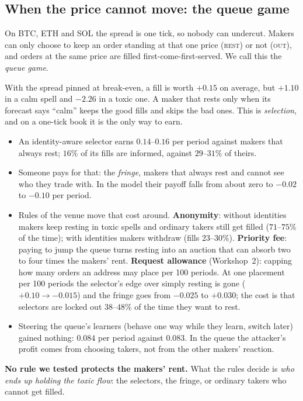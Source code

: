 \documentclass[11pt]{article}
\begin{document}
\subsection{When the price cannot move: the queue game}
On BTC, ETH and SOL the spread is one tick, so nobody can undercut. Makers can only choose to keep an
order standing at that one price (\textsc{rest}) or not (\textsc{out}), and orders at the same price are
filled first-come-first-served. We call this the \emph{queue game}.
\begin{example}
With the spread pinned at break-even, a fill is worth $+0.15$ on average, but $+1.10$ in a calm spell
and $-2.26$ in a toxic one. A maker that rests only when its forecast says ``calm'' keeps the good fills
and skips the bad ones. This is \emph{selection}, and on a one-tick book it is the only way to earn.
\end{example}
\begin{itemize}
\item An identity-aware selector earns $0.14$--$0.16$ per period against makers that always rest; $16\%$
of its fills are informed, against $29$--$31\%$ of theirs.
\item Someone pays for that: the \emph{fringe}, makers that always rest and cannot see who they trade
with. In the model their payoff falls from about zero to $-0.02$ to $-0.10$ per period.
\item Rules of the venue move that cost around. \textbf{Anonymity}: without identities makers keep
resting in toxic spells and ordinary takers still get filled ($71$--$75\%$ of the time); with identities
makers withdraw (fills $23$--$30\%$). \textbf{Priority fee}: paying to jump the queue turns resting into
an auction that can absorb two to four times the makers' rent. \textbf{Request allowance} (Workshop~2):
capping how many orders an address may place per 100 periods. At one placement per 100 periods the
selector's edge over simply resting is gone ($+0.10\to-0.015$) and the fringe goes from $-0.025$ to
$+0.030$; the cost is that selectors are locked out $38$--$48\%$ of the time they want to rest.
\item Steering the queue's learners (behave one way while they learn, switch later) gained nothing:
$0.084$ per period against $0.083$. In the queue the attacker's profit comes from choosing takers, not
from the other makers' reaction.
\end{itemize}
\begin{warning}
\textbf{No rule we tested protects the makers' rent.} What the rules decide is \emph{who ends up
holding the toxic flow}: the selectors, the fringe, or ordinary takers who cannot get filled.
\end{warning}
\end{document}
